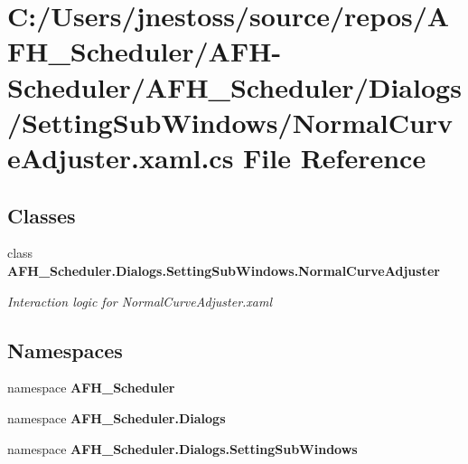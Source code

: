 \section{C\+:/\+Users/jnestoss/source/repos/\+A\+F\+H\+\_\+\+Scheduler/\+A\+F\+H-\/\+Scheduler/\+A\+F\+H\+\_\+\+Scheduler/\+Dialogs/\+Setting\+Sub\+Windows/\+Normal\+Curve\+Adjuster.xaml.\+cs File Reference}
\label{_normal_curve_adjuster_8xaml_8cs}
\subsection*{Classes}
\begin{DoxyCompactItemize}
\item 
class \textbf{ A\+F\+H\+\_\+\+Scheduler.\+Dialogs.\+Setting\+Sub\+Windows.\+Normal\+Curve\+Adjuster}
\begin{DoxyCompactList}\small\item\em Interaction logic for Normal\+Curve\+Adjuster.\+xaml \end{DoxyCompactList}\end{DoxyCompactItemize}
\subsection*{Namespaces}
\begin{DoxyCompactItemize}
\item 
namespace \textbf{ A\+F\+H\+\_\+\+Scheduler}
\item 
namespace \textbf{ A\+F\+H\+\_\+\+Scheduler.\+Dialogs}
\item 
namespace \textbf{ A\+F\+H\+\_\+\+Scheduler.\+Dialogs.\+Setting\+Sub\+Windows}
\end{DoxyCompactItemize}
